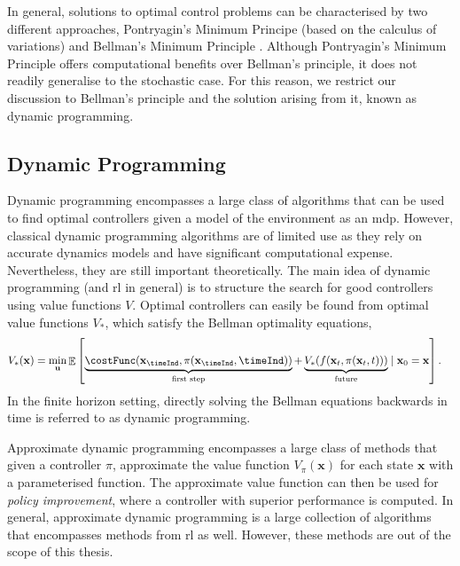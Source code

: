 \documentclass{mimosis-class/mimosis}
\numberwithin{equation}{chapter}
\DeclareMathOperator{\E}{\mathbb{E}}
\newcommand{\state}{\ensuremath{\mathbf{x}}}
\newcommand{\control}{\ensuremath{\mathbf{u}}}
\begin{document}
In general, solutions to optimal control problems can be characterised by two different approaches,
Pontryagin's Minimum Principe \citep{pontryagin1987mathematical} (based on the calculus of variations)
and Bellman's Minimum Principle \citep{bellmanDynamic1956}.
Although Pontryagin's Minimum Principle offers computational benefits over Bellman's principle, it does not
readily generalise to the stochastic case.
For this reason, we restrict our discussion to Bellman's principle and the solution arising from it, known as
dynamic programming.

\subsection{Dynamic Programming}
\label{sec:orgaf76bb3}
Dynamic programming \citep{bellmanDynamic1956} encompasses a large class of algorithms that can be
used to find optimal controllers given a model of the environment as an \acrshort{mdp}.
However, classical dynamic programming algorithms are of limited use as they rely on
accurate dynamics models and have significant computational expense.
Nevertheless, they are still important theoretically.
The main idea of dynamic programming (and \acrshort{rl} in general) is to structure the search for good controllers using
value functions \(V\).
Optimal controllers can easily be found from optimal value functions \(V_*\), which satisfy the Bellman
optimality equations,
\begin{align} \label{eq-bellman}
V_*(\state) = \min_{\control} &\E \left[ \underbrace{\costFunc(\state_{\timeInd}, \pi(\state_{\timeInd}, \timeInd))}_{\text{first step}}
+ \underbrace{V_*(f(\state_{t}, \pi(\state_{t}, t)))}_{\text{future}}
\mid \state_0=\state \right].
\end{align}
In the finite horizon setting, directly solving the Bellman equations backwards in time is referred to
as dynamic programming.

Approximate dynamic programming encompasses a large class of methods that given a controller \(\pi\),
approximate the value function \(V_{\pi}(\state)\) for each state \(\state\) with a parameterised function.
The approximate value function can then be used for \emph{policy improvement}, where a controller
with superior performance is computed.
In general, approximate dynamic programming is a large collection of algorithms that encompasses methods from
\acrshort{rl} as well.
However, these methods are out of the scope of this thesis.
\end{document}
